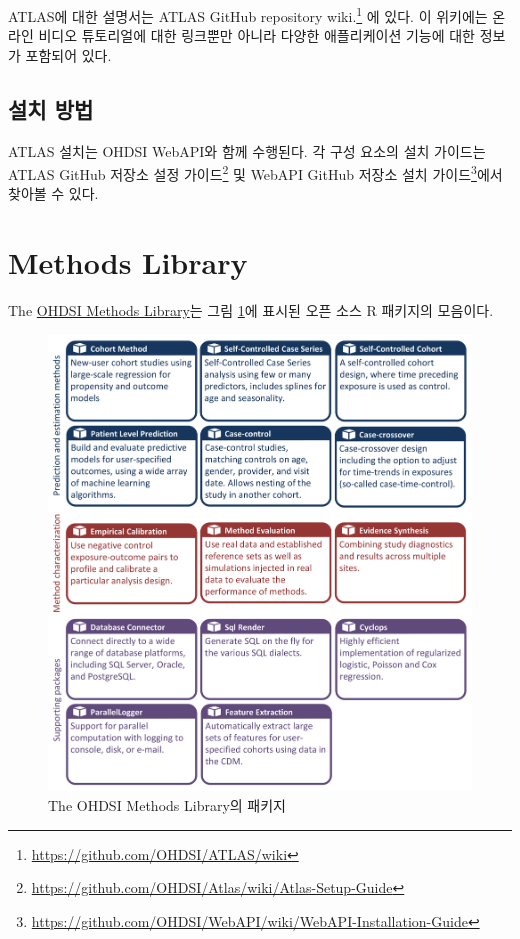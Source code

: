 \documentclass[11pt]{book}
\let\rmarkdownfootnote\footnote%
\def\footnote{\protect\rmarkdownfootnote}
\theoremstyle{definition}
\theoremstyle{definition}
\theoremstyle{definition}
\theoremstyle{remark}
\begin{document}
ATLAS에 대한 설명서는 ATLAS GitHub repository wiki.\footnote{\url{https://github.com/OHDSI/ATLAS/wiki}}
에 있다. 이 위키에는 온라인 비디오 튜토리얼에 대한 링크뿐만 아니라
다양한 애플리케이션 기능에 대한 정보가 포함되어 있다.

\subsection{설치 방법}\label{-}

ATLAS 설치는 OHDSI WebAPI와 함께 수행된다. 각 구성 요소의 설치 가이드는
ATLAS GitHub 저장소 설정 가이드\footnote{\url{https://github.com/OHDSI/Atlas/wiki/Atlas-Setup-Guide}}
및 WebAPI GitHub 저장소 설치 가이드\footnote{\url{https://github.com/OHDSI/WebAPI/wiki/WebAPI-Installation-Guide}}에서
찾아볼 수 있다. 

\section{Methods Library}\label{methods-library}

The \href{https://ohdsi.github.io/MethodsLibrary/}{OHDSI Methods
Library}는 그림 \ref{fig:methodsLibrary}에 표시된 오픈 소스 R 패키지의
모음이다. 

\begin{figure}

{\centering \includegraphics[width=1\linewidth]{images/OhdsiAnalyticsTools/methodsLibrary} 

}

\caption{The OHDSI Methods Library의 패키지}\label{fig:methodsLibrary}
\end{figure}
\end{document}
